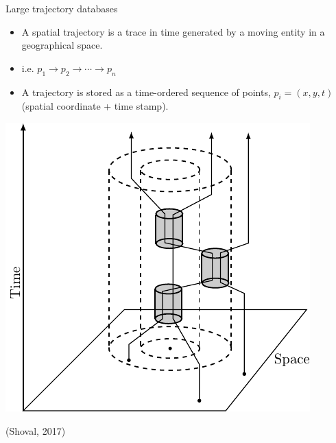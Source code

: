 \documentclass{beamer}
\begin{document}
    \begin{frame}{Large trajectory databases}
        \begin{minipage}{0.59\textwidth}
            \begin{itemize}
                \item A spatial trajectory is a trace in time generated by a moving entity in a geographical space.
                \item i.e. $p_1 \rightarrow p_2 \rightarrow \cdots \rightarrow p_n$
                \item A trajectory is stored as a time-ordered sequence of points, $p_i = (x, y, t)$ (spatial coordinate + time stamp).
            \end{itemize}
        \end{minipage}\hfill %
        \begin{minipage}{0.4\textwidth}
            \includegraphics[width=\textwidth]{figures/trajectory}
            \begin{flushright}
                {\tiny (Shoval, 2017)}
            \end{flushright}
        \end{minipage}
    \end{frame}
\end{document}
